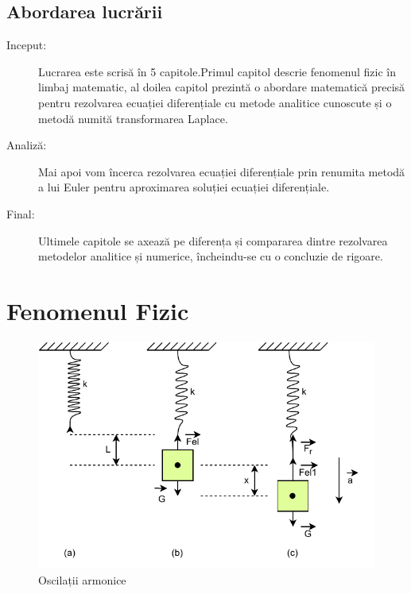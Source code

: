 \documentclass[12pt, a4paper]{article}
\begin{document}
\subsection{Abordarea lucrării}
\begin{description}
\item [Inceput:] Lucrarea este scrisă în 5 capitole.Primul capitol descrie fenomenul fizic în limbaj matematic, al doilea capitol prezintă o abordare matematică precisă pentru rezolvarea ecuației diferențiale cu metode analitice cunoscute și o metodă numită transformarea Laplace.
\item [Analiză:] Mai apoi vom încerca rezolvarea ecuației diferențiale prin renumita metodă a lui Euler pentru aproximarea soluției ecuației diferențiale.
\item [Final:] Ultimele capitole se axează pe diferența și compararea dintre rezolvarea metodelor analitice și numerice, încheindu-se cu o concluzie de rigoare.
\end{description}

\section{Fenomenul Fizic}
\begin{figure}[h]
    \centering
    \includegraphics[width=\linewidth, scale=5]{Oscilatii}
    \caption{Oscilații armonice}
    \label{fig:oscilatii}
\end{figure}
\end{document}
